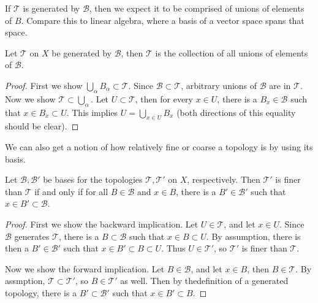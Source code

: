 \documentclass[10pt]{report}
\begin{document}
If $\mathcal{T}$ is generated by $\mathcal{B}$, then we expect it to be comprised of unions of elements of $B$. Compare this to linear algebra, where a basis of a vector space spans that space.

\begin{prop}
	Let $\mathcal{T}$ on $X$ be generated by $\mathcal{B}$, then $\mathcal{T}$ is the collection of all unions of elements of $\mathcal{B}$.
\end{prop}
\begin{proof}
	First we show $\bigcup_{\alpha}B_\alpha \subset \mathcal{T}$. Since $\mathcal{B} \subset \mathcal{T}$, arbitrary unions of $\mathcal{B}$ are in $\mathcal{T}$. Now we show $\mathcal{T} \subset \bigcup_{\alpha}$. Let $U \subset \mathcal{T}$, then for every $x \in U$, there is a $B_x \in \mathcal{B}$ such that $x \in B_x \subset U$. This implies $U = \bigcup_{x\in U}B_x$ (both directions of this equality should be clear).
\end{proof}

We can also get a notion of how relatively fine or coarse a topology is by using its basis.

\begin{prop}
	Let $\mathcal{B}, \mathcal{B}'$ be bases for the topologies $\mathcal{T},\mathcal{T}'$ on $X$, respectively. Then $\mathcal{T}'$ is finer than $\mathcal{T}$ if and only if for all $B \in \mathcal{B}$ and $x \in B$, there is a $B' \in \mathcal{B}'$ such that $x \in B' \subset \mathcal{B}$.
\end{prop}
\begin{proof}
	First we show the backward implication. Let $U \in \mathcal{T}$, and let $x \in U$. Since $\mathcal{B}$ generates $\mathcal{T}$, there is a $B \subset \mathcal{B}$ such that $x \in B \subset U$. By assumption, there is then a $B' \in \mathcal{B}'$ such that $x \in B' \subset B \subset U$. Thus $U \in \mathcal{T}'$, so $\mathcal{T}'$ is finer than $\mathcal{T}$.

	Now we show the forward implication. Let $B \in \mathcal{B}$, and let $x \in B$, then $B \in \mathcal{T}$. By assmption, $\mathcal{T} \subset \mathcal{T}'$, so $B \in \mathcal{T}'$ as well. Then by thedefinition of a generated topology, there is a $B' \subset \mathcal{B}'$ such that $x \in B' \subset B$.
\end{proof}
\end{document}
